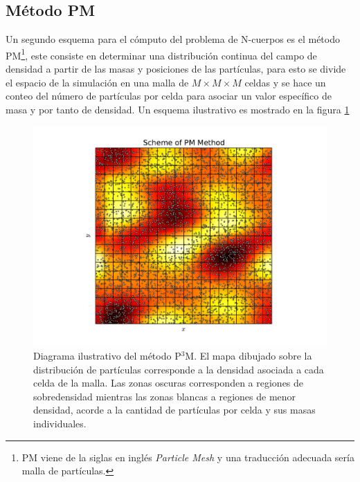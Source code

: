 	\subsection{Método PM}
	\label{subsec:PMMethod}
	
	
Un segundo esquema para el cómputo del problema de N-cuerpos es el método 
PM\footnote{PM viene de la siglas en inglés \textit{Particle Mesh} y 
una traducción adecuada sería malla de partículas.}\cite{dawson1983}, este 
consiste en determinar una distribución continua del campo de densidad a 
partir de las masas y posiciones de las partículas, para esto se divide el 
espacio de la simulación en una malla de $M\times M\times M$ celdas y se 
hace un conteo del número de partículas por celda para asociar un valor 
específico de masa y por tanto de densidad. Un esquema ilustrativo es 
mostrado en la figura \ref{fig:MP_Method}


\begin{figure}[htbp]
	\centering
	\includegraphics[width=1.00\textwidth]
	{./figures/3_nbody_simulations/PM_Method.pdf}

	\caption{\small{Diagrama ilustrativo del método P$^3$M. El mapa 
	dibujado sobre la distribución de partículas corresponde a la densidad
	asociada a cada celda de la malla. Las zonas oscuras corresponden a 
	regiones de sobredensidad mientras las zonas blancas a regiones de 
	menor densidad, acorde a la cantidad de partículas por celda y sus 
	masas individuales.}}
	
	\label{fig:MP_Method}
\end{figure}


